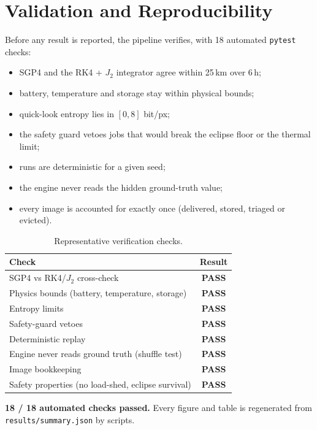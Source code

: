 \documentclass[11pt,a4paper]{article}
\newcommand{\pass}{\textcolor{kgreen}{\textbf{PASS}}}
\begin{document}
\section{Validation and Reproducibility}
Before any result is reported, the pipeline verifies, with 18 automated \texttt{pytest} checks:
\begin{itemize}
  \item SGP4 and the RK4 + $J_2$ integrator agree within 25\,km over 6\,h;
  \item battery, temperature and storage stay within physical bounds;
  \item quick-look entropy lies in $[0, 8]$ bit/px;
  \item the safety guard vetoes jobs that would break the eclipse floor or the thermal limit;
  \item runs are deterministic for a given seed;
  \item the engine never reads the hidden ground-truth value;
  \item every image is accounted for exactly once (delivered, stored, triaged or evicted).
\end{itemize}

\begin{table}[H]
\centering
\caption{Representative verification checks.}
\small
\begin{tabular}{@{}lc@{}}
\toprule
\textbf{Check} & \textbf{Result} \\
\midrule
SGP4 vs RK4/$J_2$ cross-check & \pass \\
Physics bounds (battery, temperature, storage) & \pass \\
Entropy limits & \pass \\
Safety-guard vetoes & \pass \\
Deterministic replay & \pass \\
Engine never reads ground truth (shuffle test) & \pass \\
Image bookkeeping & \pass \\
Safety properties (no load-shed, eclipse survival) & \pass \\
\bottomrule
\end{tabular}
\end{table}

\begin{resultbox}
\textbf{18 / 18 automated checks passed.} Every figure and table is regenerated from \texttt{results/summary.json} by scripts.
\end{resultbox}
\end{document}
